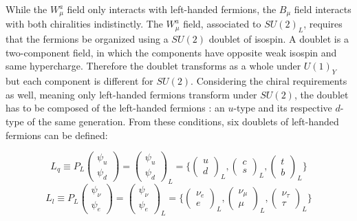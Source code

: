 While the $W_{\mu}^a$ field only interacts with left-handed fermions, the $B_{\mu}$ field interacts with both chiralities indistinctly.
The $W_{\mu}^a$ field, associated to $SU(2)_L$, requires that the fermions be organized using a $SU(2)$ doublet of isospin. A doublet is a two-component field, in which the components have opposite weak isospin and same hypercharge. Therefore the doublet transforms as a whole under $U(1)_Y$ but each component is different for $SU(2)$. Considering the chiral requirements as well, meaning only left-handed fermions transform under $SU(2)$, the doublet has to be composed of the left-handed fermions : an $u$-type and its respective $d$-type of the same generation. From these conditions, six doublets of left-handed fermions can be defined:

\begin{equation}
    L_q \equiv P_L \begin{pmatrix} \psi_u \\ \psi_d \end{pmatrix} = \begin{pmatrix} \psi_u \\ \psi_d \end{pmatrix}_L = \Bigg\{ \begin{pmatrix} u \\ d \end{pmatrix}_L , \begin{pmatrix} c \\ s \end{pmatrix}_L , \begin{pmatrix} t \\ b \end{pmatrix}_L \Bigg\} 
\end{equation}
\begin{equation}
    L_l \equiv P_L \begin{pmatrix} \psi_{\nu} \\ \psi_e \end{pmatrix} = \begin{pmatrix} \psi_{\nu} \\ \psi_e \end{pmatrix}_L = \Bigg\{ \begin{pmatrix} \nu_e \\ e \end{pmatrix}_L , \begin{pmatrix} \nu_{\mu} \\ \mu \end{pmatrix}_L , \begin{pmatrix} \nu_{\tau} \\ \tau \end{pmatrix}_L \Bigg\} 
\end{equation}

